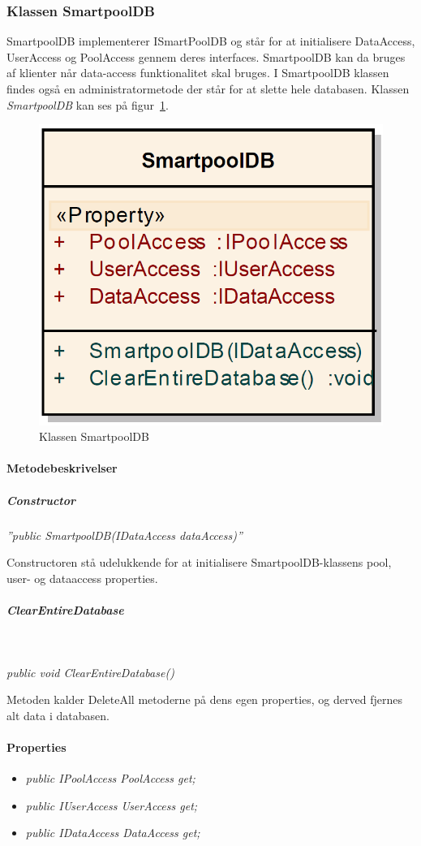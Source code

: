\subsubsection{Klassen SmartpoolDB}
SmartpoolDB implementerer ISmartPoolDB og står for at initialisere DataAccess, UserAccess og PoolAccess gennem deres interfaces. SmartpoolDB kan da bruges af klienter når data-access funktionalitet skal bruges. I SmartpoolDB klassen findes også en administratormetode der står for at slette hele databasen. Klassen \textit{SmartpoolDB} kan ses på figur~\ref{fig:smartpoolDBClass}.

\begin{figure}[h]
\centering
\includegraphics[width=0.3\linewidth]{figs/implementering/smartpoolDBClass.PNG}
\caption{Klassen SmartpoolDB}
\label{fig:smartpoolDBClass}
\end{figure}

\paragraph{Metodebeskrivelser}
\subparagraph{Constructor}
\textit{''public SmartpoolDB(IDataAccess dataAccess)''}

Constructoren stå udelukkende for at initialisere SmartpoolDB-klassens pool, user- og dataaccess properties.

\subparagraph{ClearEntireDatabase}\

\textit{public void ClearEntireDatabase()}

Metoden kalder DeleteAll metoderne på dens egen properties, og derved fjernes alt data i databasen.

\paragraph{Properties}

\begin{itemize}
	\item \textit{public IPoolAccess PoolAccess { get; }}
	\item \textit{public IUserAccess UserAccess { get; }}
	\item \textit{public IDataAccess DataAccess { get; }}
\end{itemize}





